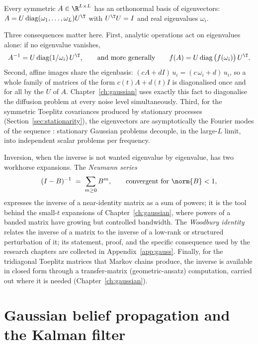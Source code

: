 \begin{theorem}
\label{thm:spectral}
Every symmetric $A \in \R^{L \times L}$ has an orthonormal basis of
eigenvectors: $A = U \operatorname{diag}(\omega_1, \dots, \omega_L)
U^\T$ with $U^\T U = I$ and real eigenvalues $\omega_i$.
\end{theorem}

Three consequences matter here. First, analytic operations act on
eigenvalues alone: if no eigenvalue vanishes,
\begin{equation*}
  A^{-1} = U \operatorname{diag}(1/\omega_i)\, U^\T,
  \qquad\text{and more generally}\qquad
  f(A) = U \operatorname{diag}\big(f(\omega_i)\big)\, U^\T .
\end{equation*} Second, affine images
share the eigenbasis: $(cA + dI)\, u_i = (c\,\omega_i + d)\, u_i$, so a
whole family of matrices of the form $c(t) A + d(t) I$ is diagonalised
once and for all by the $U$ of $A$. Chapter~\ref{ch:gaussian} uses
exactly this fact to diagonalise the diffusion problem at every noise
level simultaneously. Third, for the symmetric
Toeplitz covariances produced by stationary processes
(Section~\ref{sec:stationarity}), the eigenvectors are asymptotically the
Fourier modes of the sequence \citep{brockwell1991time}: stationary
Gaussian problems decouple, in the large-$L$ limit, into independent
scalar problems per frequency.

Inversion, when the inverse is not wanted eigenvalue by eigenvalue, has
two workhorse expansions. The \emph{Neumann series}
\begin{equation}
  (I - B)^{-1} \;=\; \sum_{m \geq 0} B^m ,
  \qquad \text{convergent for } \norm{B} < 1 ,
  \label{eq:neumann}
\end{equation}
expresses the inverse of a near-identity matrix as a sum of powers; it is
the tool behind the small-$t$ expansions of Chapter~\ref{ch:gaussian},
where powers of a banded matrix have growing but controlled bandwidth.
The \emph{Woodbury identity} relates the inverse of a matrix to the
inverse of a low-rank or structured perturbation of it; its statement,
proof, and the specific consequence used by the research chapters are
collected in Appendix~\ref{app:gauss}. Finally, for the tridiagonal
Toeplitz matrices that Markov chains produce, the inverse is available in
closed form through a transfer-matrix (geometric-ansatz) computation,
carried out where it is needed
(Chapter~\ref{ch:gaussian}).

\section{Gaussian belief propagation and the Kalman filter}
\label{sec:gaussian-bp}

